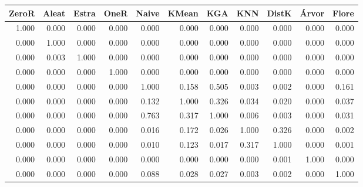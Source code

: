 \begin{table}
\centering
\label{Wine_p_value_table}
\begin{tabular}{rrrrrrrrrrr}
\toprule
ZeroR & Aleat & Estra & OneR  & Naive & KMean &   KGA &   KNN & DistK & Árvor & Flore \\
\midrule
1.000 & 0.000 & 0.000 & 0.000 & 0.000 & 0.000 & 0.000 & 0.000 & 0.000 & 0.000 & 0.000 \\
0.000 & 1.000 & 0.000 & 0.000 & 0.000 & 0.000 & 0.000 & 0.000 & 0.000 & 0.000 & 0.000 \\
0.000 & 0.003 & 1.000 & 0.000 & 0.000 & 0.000 & 0.000 & 0.000 & 0.000 & 0.000 & 0.000 \\
0.000 & 0.000 & 0.000 & 1.000 & 0.000 & 0.000 & 0.000 & 0.000 & 0.000 & 0.000 & 0.000 \\
0.000 & 0.000 & 0.000 & 0.000 & 1.000 & 0.158 & 0.505 & 0.003 & 0.002 & 0.000 & 0.161 \\
0.000 & 0.000 & 0.000 & 0.000 & 0.132 & 1.000 & 0.326 & 0.034 & 0.020 & 0.000 & 0.037 \\
0.000 & 0.000 & 0.000 & 0.000 & 0.763 & 0.317 & 1.000 & 0.006 & 0.003 & 0.000 & 0.031 \\
0.000 & 0.000 & 0.000 & 0.000 & 0.016 & 0.172 & 0.026 & 1.000 & 0.326 & 0.000 & 0.002 \\
0.000 & 0.000 & 0.000 & 0.000 & 0.010 & 0.123 & 0.017 & 0.317 & 1.000 & 0.000 & 0.001 \\
0.000 & 0.000 & 0.000 & 0.000 & 0.000 & 0.000 & 0.000 & 0.000 & 0.001 & 1.000 & 0.000 \\
0.000 & 0.000 & 0.000 & 0.000 & 0.088 & 0.028 & 0.027 & 0.003 & 0.002 & 0.000 & 1.000 \\
\bottomrule
\end{tabular}
\end{table}
